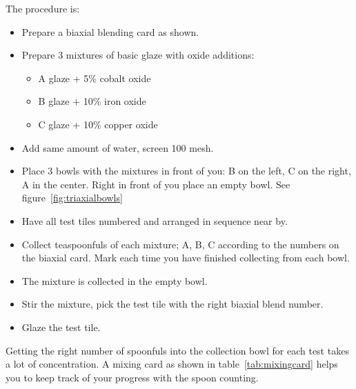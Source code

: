 The procedure is:
\begin{itemize}
\item Prepare a biaxial blending card as shown.
\item Prepare 3 mixtures of basic glaze with oxide additions:
\begin{itemize}
\item A glaze + 5\% cobalt oxide
\item B glaze + 10\% iron oxide
\item C glaze + 10\% copper oxide
\end{itemize}
\item Add same amount of water, screen 100 mesh.
\item Place 3 bowls with the mixtures in front of you: B on the left, C on the 
right, A in the center. Right in front of you place an empty bowl. See 
figure~\ref{fig:triaxialbowls}
\item Have all test tiles numbered and arranged in sequence near by.
\item Collect teaspoonfuls of each mixture; A, B, C according to the numbers on 
the biaxial card. Mark each time you have finished collecting from each bowl.
\item The mixture is collected in the empty bowl.
\item Stir the mixture, pick the test tile with the right biaxial blend number.
\item Glaze the test tile.
\end{itemize}
Getting the right number of spoonfuls into the collection bowl for each test 
takes a lot of concentration. A mixing card as shown in 
table~\ref{tab:mixingcard} helps you to keep track of your progress with the 
spoon counting.
